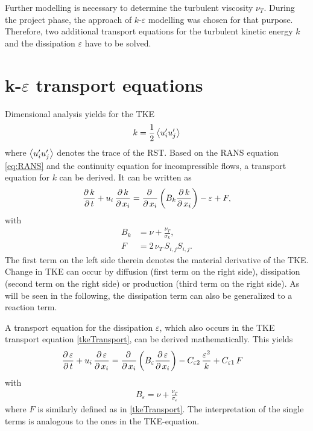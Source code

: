 \noii Further modelling is necessary to determine the turbulent viscosity $\nu_T$. During the project phase, the approach of $k$-$\varepsilon$ modelling was chosen for that purpose. Therefore, two additional transport equations for the turbulent kinetic energy $k$ and the dissipation $\varepsilon$ have to be solved.

\section{k-$\varepsilon$ transport equations} %
\label{sec:k_epsilon_transport_equations}

Dimensional analysis yields for the TKE
\begin{equation}
	k = \frac{1}{2} \left\langle u_i^{\prime}u_j^{\prime} \right\rangle
\end{equation}
where $\left\langle u_i^{\prime}u_j^{\prime} \right\rangle$ denotes the trace of the RST. Based on the RANS equation \eqref{eq:RANS} and the continuity equation for incompressible flows, a transport equation for $k$ can be derived.
It can be written as
\begin{equation} \label{tkeTransport}
	\frac{\partial\,k}{\partial\,t} + u_i\,\frac{\partial\,k}{\partial\,x_i}
	=
	\frac{\partial\,}{\partial\,x_i}\left(  B_k \frac{\partial\,k}{\partial\,x_i} \right) 
	-
	\varepsilon
	+
	F,
\end{equation}
with
\begin{equation}
	\begin{split}
		B_k &= \nu + \frac{\nu_T}{\sigma_k},\\
		F   &= 2\,\nu_T\,S_{i,j}S_{i,j}.
	\end{split}
\end{equation}
The first term on the left side therein denotes the material derivative of the TKE. Change in TKE can occur by diffusion (first term on the right side), dissipation (second term on the right side) or production (third term on the right side). As will be seen in the following, the dissipation term can also be generalized to a reaction term.

\noii A transport equation for the dissipation $\varepsilon$, which also occurs in the TKE transport equation \eqref{tkeTransport}, can be derived mathematically. This yields
\begin{equation}
	\begin{split}
		\frac{\partial\,\varepsilon}{\partial\,t} + u_i\,\frac{\partial\,\varepsilon}{\partial\,x_i}
		&=
		\frac{\partial\,}{\partial\,x_i}\left( B_\varepsilon \frac{\partial\,\varepsilon}{\partial\,x_i} \right) 
		-
		C_{\varepsilon 2}\,\frac{\varepsilon^2}{k}
		+
		C_{\varepsilon 1}\,F
	\end{split}
\end{equation}
with
\begin{equation}
	\begin{split}
		B_\varepsilon = \nu + \frac{\nu_T}{\sigma_\varepsilon}
	\end{split}
\end{equation}
where $F$ is similarly defined as in \eqref{tkeTransport}. The interpretation of the single terms is analogous to the ones in the TKE-equation. 

